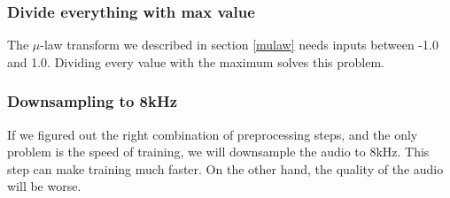 \documentclass[12pt]{article}
\begin{document}
	\subsubsection{Divide everything with max value}
	The $\mu$-law transform we described in section \ref{mulaw} needs inputs between -1.0 and 1.0. Dividing every value with the maximum solves this problem.
	
	\subsubsection{Downsampling to 8kHz}
	
	If we figured out the right combination of preprocessing steps, and the only problem is the speed of training, we will downsample the audio to 8kHz. This step can make training much faster. On the other hand, the quality of the audio will be worse.
	
	\newpage
	\printbibliography
	
	
\end{document}
